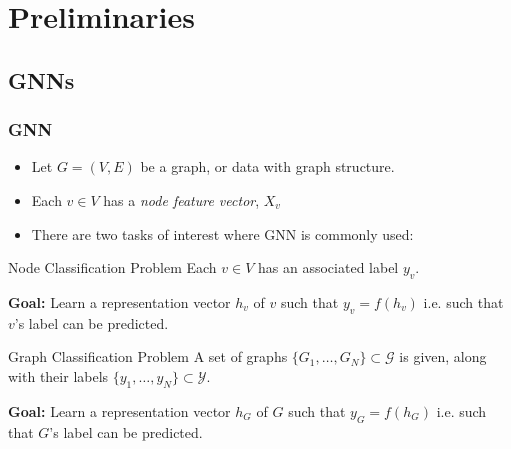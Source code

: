 \documentclass{beamer}
\begin{document}

\section{Preliminaries}


\subsection{GNNs}

\begin{frame}
\frametitle{GNN}

\begin{itemize}
	\item Let $G = (V, E)$ be a graph, or data with graph structure. \pause
	
	\item Each $v \in V$ has a {\it node feature vector}, $X_v$ \pause
	
	\item There are two tasks of interest where GNN is commonly used: \pause
\end{itemize}

\begin{block}{Node Classification Problem}
Each $v \in V$ has an associated label $y_v$.

{\bf Goal:} Learn a representation vector $h_v$ of $v$ such that $y_v = f(h_v)$ i.e. such that $v$'s label can be predicted. 
\end{block} \pause

\begin{block}{Graph Classification Problem}
A set of graphs $\{G_1, \dots, G_N\} \subset \mathcal{G}$ is given, along with their labels $\{y_1, \dots, y_N\} \subset \mathcal{Y}$.

{\bf Goal:} Learn a representation vector $h_G$ of $G$ such that $y_G = f(h_G)$ i.e. such that $G$'s label can be predicted. 
\end{block}

\end{frame}
\end{document}
